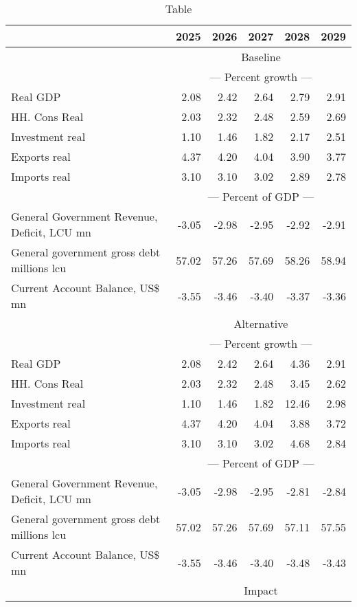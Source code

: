 \documentclass{article}
\begin{document}
\begin{table}[ht]
\caption{Table}
\begin{tabular}{lrrrrr}
\toprule
 & 2025 & 2026 & 2027 & 2028 & 2029 \\
\midrule
&\multicolumn{5}{c}{{Baseline}}                          \\
&\multicolumn{5}{c}{{--- Percent growth ---}}                          \\
Real GDP & 2.08 & 2.42 & 2.64 & 2.79 & 2.91 \\
HH. Cons Real & 2.03 & 2.32 & 2.48 & 2.59 & 2.69 \\
Investment real & 1.10 & 1.46 & 1.82 & 2.17 & 2.51 \\
Exports real & 4.37 & 4.20 & 4.04 & 3.90 & 3.77 \\
Imports real & 3.10 & 3.10 & 3.02 & 2.89 & 2.78 \\
&\multicolumn{5}{c}{{--- Percent of GDP ---}}                          \\
General Government Revenue, Deficit, LCU mn & -3.05 & -2.98 & -2.95 & -2.92 & -2.91 \\
General government gross debt millions lcu & 57.02 & 57.26 & 57.69 & 58.26 & 58.94 \\
Current Account Balance, US\$ mn & -3.55 & -3.46 & -3.40 & -3.37 & -3.36 \\
&\multicolumn{5}{c}{{Alternative}}                          \\
&\multicolumn{5}{c}{{--- Percent growth ---}}                          \\
Real GDP & 2.08 & 2.42 & 2.64 & 4.36 & 2.91 \\
HH. Cons Real & 2.03 & 2.32 & 2.48 & 3.45 & 2.62 \\
Investment real & 1.10 & 1.46 & 1.82 & 12.46 & 2.98 \\
Exports real & 4.37 & 4.20 & 4.04 & 3.88 & 3.72 \\
Imports real & 3.10 & 3.10 & 3.02 & 4.68 & 2.84 \\
&\multicolumn{5}{c}{{--- Percent of GDP ---}}                          \\
General Government Revenue, Deficit, LCU mn & -3.05 & -2.98 & -2.95 & -2.81 & -2.84 \\
General government gross debt millions lcu & 57.02 & 57.26 & 57.69 & 57.11 & 57.55 \\
Current Account Balance, US\$ mn & -3.55 & -3.46 & -3.40 & -3.48 & -3.43 \\
&\multicolumn{5}{c}{{Impact}}                          \\

\end{tabular}
\end{table}
\end{document}
